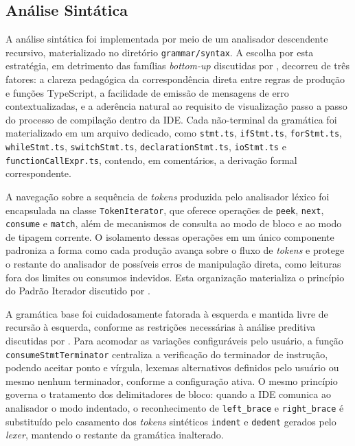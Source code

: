 \subsection{Análise Sintática}
\label{subsec:analise-sintatica}

A análise sintática foi implementada por meio de um analisador descendente recursivo, materializado no diretório \texttt{grammar/syntax}. A escolha por esta estratégia, em detrimento das famílias \textit{bottom-up} discutidas por , decorreu de três fatores: a clareza pedagógica da correspondência direta entre regras de produção e funções TypeScript, a facilidade de emissão de mensagens de erro contextualizadas, e a aderência natural ao requisito de visualização passo a passo do processo de compilação dentro da IDE. Cada não-terminal da gramática foi materializado em um arquivo dedicado, como \texttt{stmt.ts}, \texttt{ifStmt.ts}, \texttt{forStmt.ts}, \texttt{whileStmt.ts}, \texttt{switchStmt.ts}, \texttt{declarationStmt.ts}, \texttt{ioStmt.ts} e \texttt{functionCallExpr.ts}, contendo, em comentários, a derivação formal correspondente.

A navegação sobre a sequência de \textit{tokens} produzida pelo analisador léxico foi encapsulada na classe \texttt{TokenIterator}, que oferece operações de \texttt{peek}, \texttt{next}, \texttt{consume} e \texttt{match}, além de mecanismos de consulta ao modo de bloco e ao modo de tipagem corrente. O isolamento dessas operações em um único componente padroniza a forma como cada produção avança sobre o fluxo de \textit{tokens} e protege o restante do analisador de possíveis erros de manipulação direta, como leituras fora dos limites ou consumos indevidos. Esta organização materializa o princípio do Padrão Iterador discutido por .

A gramática base foi cuidadosamente fatorada à esquerda e mantida livre de recursão à esquerda, conforme as restrições necessárias à análise preditiva discutidas por . Para acomodar as variações configuráveis pelo usuário, a função \texttt{consumeStmt}\allowbreak\texttt{Terminator} centraliza a verificação do terminador de instrução, podendo aceitar ponto e vírgula, lexemas alternativos definidos pelo usuário ou mesmo nenhum terminador, conforme a configuração ativa. O mesmo princípio governa o tratamento dos delimitadores de bloco: quando a IDE comunica ao analisador o modo indentado, o reconhecimento de \texttt{left\_brace} e \texttt{right\_brace} é substituído pelo casamento dos \textit{tokens} sintéticos \texttt{indent} e \texttt{dedent} gerados pelo \textit{lexer}, mantendo o restante da gramática inalterado.

